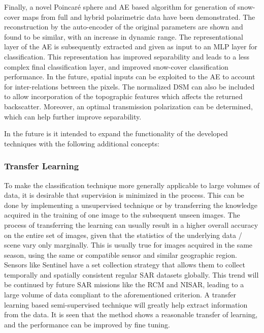 Finally, a novel Poincar\'e sphere and AE based algorithm for generation of snow-cover maps from full and hybrid polarimetric data have been demonstrated. The reconstruction by the auto-encoder of the original parameters are shown and found to be similar, with an increase in dynamic range. The representational layer of the AE is subsequently extracted and given as input to an MLP layer for classification. This representation has improved separability and leads to a less complex final classification layer, and improved snow-cover classification performance. 
In the future, spatial inputs can be exploited to the AE to account for inter-relations between the pixels. The normalized DSM can also be included to allow incorporation of the topographic features which affects the returned backscatter. 
Moreover, an optimal transmission polarization can be determined, which can help further improve separability. 

In the future is it intended to expand the functionality of the developed techniques with the following additional concepts:

\subsubsection*{Transfer Learning}
To make the classification technique more generally applicable to large volumes of data, it is desirable that supervision is minimized in the process. This can be done by implementing a unsupervised technique or by transferring the knowledge acquired in the training of one image to the subsequent unseen images. The process of transferring the learning can usually result in a higher overall accuracy on the entire set of images, given that the statistics of the underlying data / scene vary only marginally. This is usually true for images acquired in the same season, using the same or compatible sensor and similar geographic region. Sensors like Sentinel have a set collection strategy that allows them to collect temporally and spatially consistent regular SAR datasets globally. This trend will be continued by future SAR missions like the RCM and NISAR, leading to a large volume of data compliant to the aforementioned criterion. A transfer learning based semi-supervised technique will greatly help extract information from the data. It is seen that the method shows a reasonable transfer of learning, and the performance can be improved by fine tuning.



